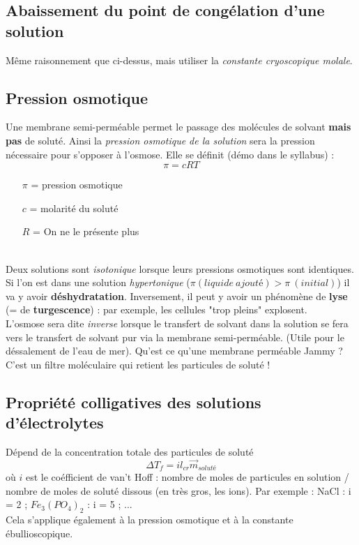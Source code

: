 \documentclass	[11pt, a4paper, openany]{book}
\begin{document}
\subsection{Abaissement du point de congélation d'une solution}
Même raisonnement que ci-dessus, mais utiliser la \textit{constante cryoscopique molale}.

\subsection{Pression osmotique}
Une membrane semi-perméable permet le passage des molécules de solvant \textbf{mais pas} de soluté. Ainsi la \textit{pression osmotique de la solution} sera la pression nécessaire pour s'opposer à l'osmose. Elle se définit (démo dans le syllabus) : 
$$\pi = c R T$$
\begin{itemize}
	\item[$\pi$] = pression osmotique
	\item[$c$] = molarité du soluté
	\item[$R$] = On ne le présente plus
\end{itemize}
\ \\
Deux solutions sont \textit{isotonique} lorsque leurs pressions osmotiques sont identiques.\\

Si l'on est dans une solution \textit{hypertonique} ($\pi(liquide\ ajouté) > \pi\ (initial)$) il va y avoir \textbf{déshydratation}. Inversement, il peut y avoir un phénomène de \textbf{lyse} (= de \textbf{turgescence}) : par exemple, les cellules "trop pleins" explosent.
\\

L'osmose sera dite \textit{inverse} lorsque le transfert de solvant dans la solution se fera vers le transfert de solvant pur via la membrane semi-perméable. (Utile pour le déssalement de l'eau de mer). 
Qu'est ce qu'une membrane perméable Jammy ? C'est un filtre moléculaire qui retient les particules de soluté !

\subsection{Propriété colligatives des solutions d'électrolytes}
Dépend de la concentration totale des particules de soluté
$$\Delta T_f = i l_{cr} \vec{m}_{soluté}$$
où $i$ est le coéfficient  de van't Hoff : nombre de moles de particules en solution / nombre de moles de soluté dissous (en très gros, les ions). Par exemple : NaCl : i = 2 ; $Fe_3(PO_4)_2$ : i = 5 ; ...\\
Cela s'applique également à la pression osmotique et à la constante ébullioscopique.
\end{document}
